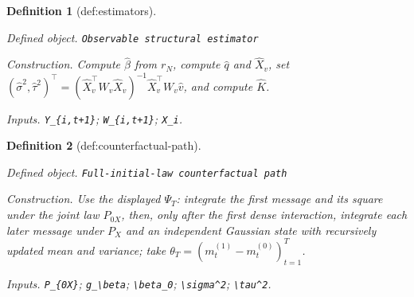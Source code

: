 \documentclass{article}
\newtheorem{definition}{Definition}
\begin{document}
\begin{definition}[def:estimators]\label{def:estimators}
\par\smallskip\noindent\emph{Defined object.} \texttt{Observable structural estimator}
\par\smallskip\noindent\emph{Construction.} Compute \(\widehat\beta\) from \(r_N\), compute \(\widehat q\) and \(\widehat X_v\), set \((\widehat\sigma^2,\widehat\tau^2)^{\top}=(\widehat X_v^{\top}W_v\widehat X_v)^{-1}\widehat X_v^{\top}W_v\widehat v\), and compute \(\widehat K\).
\par\smallskip\noindent\emph{Inputs.} \texttt{Y\_\allowbreak{}\{i,\allowbreak{}t+\allowbreak{}1\}\allowbreak{}}; \texttt{W\_\allowbreak{}\{i,\allowbreak{}t+\allowbreak{}1\}\allowbreak{}}; \texttt{X\_\allowbreak{}i}.
\end{definition}

\begin{definition}[def:counterfactual-path]\label{def:counterfactual-path}
\par\smallskip\noindent\emph{Defined object.} \texttt{Full-\allowbreak{}initial-\allowbreak{}law counterfactual path}
\par\smallskip\noindent\emph{Construction.} Use the displayed \(\Psi_T\): integrate the first message and its square under the joint law \(P_{0X}\), then, only after the first dense interaction, integrate each later message under \(P_X\) and an independent Gaussian state with recursively updated mean and variance; take \(\theta_T=(m_t^{(1)}-m_t^{(0)})_{t=1}^T\).
\par\smallskip\noindent\emph{Inputs.} \texttt{P\_\allowbreak{}\{0X\}\allowbreak{}}; \texttt{g\_\allowbreak{}\textbackslash{}\allowbreak{}beta}; \texttt{\textbackslash{}\allowbreak{}beta\_\allowbreak{}0}; \texttt{\textbackslash{}\allowbreak{}sigma\textasciicircum{}2}; \texttt{\textbackslash{}\allowbreak{}tau\textasciicircum{}2}.
\end{definition}
\end{document}
